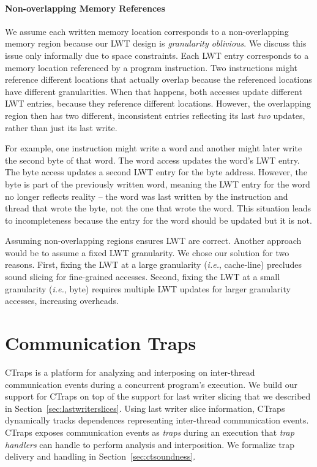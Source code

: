 \documentclass[preprint,9pt]{sigplanconf}
\newcommand{\ctraps}{CTraps\xspace}
\newcommand{\lwt}{LWT\xspace}
\begin{document}
\paragraph{Non-overlapping Memory References} 
We assume each written memory location corresponds to a non-overlapping memory
region because our \lwt design is {\em granularity oblivious}.  We discuss this
issue only informally due to space constraints.  Each \lwt entry corresponds to
a memory location referenced by a program instruction.  Two instructions might
reference different locations that actually overlap because the referenced
locations have different granularities.  When that happens, both accesses
update different \lwt entries, because they reference different locations.
However, the overlapping region then has two different, inconsistent entries
reflecting its last {\em two} updates, rather than just its last write.

For example, one instruction might write a word and another might later write
the second byte of that word.  The word access updates the word's \lwt entry.
The byte access updates a second \lwt entry for the byte address.  However, the
byte is part of the previously written word, meaning the \lwt entry for the
word no longer reflects reality -- the word was last written by the instruction
and thread that wrote the byte, not the one that wrote the word.  This
situation leads to incompleteness because the entry for the word should be
updated but it is not.

Assuming non-overlapping regions ensures \lwt are correct.  Another
approach would be to assume a fixed \lwt granularity.  We chose our solution
for two reasons.  First, fixing the \lwt at a large granularity ({\em i.e.},
cache-line) precludes sound slicing for fine-grained accesses.  Second, fixing
the \lwt at a small granularity ({\em i.e.}, byte) requires multiple \lwt
updates for larger granularity accesses, increasing overheads.





\section{Communication Traps}
\label{sec:ctraps}

\ctraps is a platform for analyzing and interposing on inter-thread
communication events during a concurrent program's execution.  We build our
support for \ctraps on top of the support for last writer slicing that we
described in Section~\ref{sec:lastwriterslices}.  Using last writer slice
information, \ctraps dynamically tracks dependences representing inter-thread
communication events. \ctraps exposes communication events as {\em traps}
during an execution that {\em trap handlers} can handle to perform analysis
and interposition.  We formalize trap delivery and handling in
Section~\ref{sec:ctsoundness}.
\end{document}
